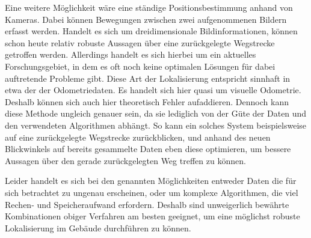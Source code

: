 Eine weitere Möglichkeit wäre eine ständige Positionsbestimmung anhand von Kameras. Dabei können Bewegungen zwischen zwei aufgenommenen Bildern erfasst werden. Handelt es sich um dreidimensionale Bildinformationen, können schon heute relativ robuste Aussagen über eine zurückgelegte Wegstrecke getroffen werden. Allerdings handelt es sich hierbei um ein aktuelles Forschungsgebiet, in dem es oft noch keine optimalen Lösungen für dabei auftretende Probleme gibt. Diese Art der Lokalisierung entspricht sinnhaft in etwa der der Odometriedaten. Es handelt sich hier quasi um visuelle Odometrie. Deshalb können sich auch hier theoretisch Fehler aufaddieren. Dennoch kann diese Methode ungleich genauer sein, da sie lediglich von der Güte der Daten und den verwendeten Algorithmen abhängt. So kann ein solches System beispielsweise auf eine zurückgelegte Wegstrecke zurückblicken, und anhand des neuen Blickwinkels auf bereits gesammelte Daten eben diese optimieren, um bessere Aussagen über den gerade zurückgelegten Weg treffen zu können.

Leider handelt es sich bei den genannten Möglichkeiten entweder Daten die für sich betrachtet zu ungenau erscheinen, oder um komplexe Algorithmen, die viel Rechen- und Speicheraufwand erfordern. Deshalb sind unweigerlich bewährte Kombinationen obiger Verfahren am besten geeignet, um eine möglichst robuste Lokalisierung im Gebäude durchführen zu können.